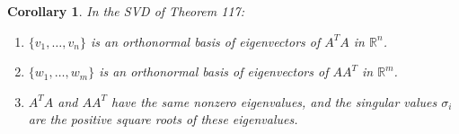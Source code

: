 \documentclass[12pt]{article}
\theoremstyle{break}             %
\newtheorem{cor}[thm]{Corollary}
\begin{document}
\begin{cor}
In the SVD of Theorem 117:
\begin{enumerate}
  \item \(\{v_1,\dots,v_n\}\) is an orthonormal basis of eigenvectors of \(A^T A\) in \(\mathbb{R}^n\).
  \item \(\{w_1,\dots,w_m\}\) is an orthonormal basis of eigenvectors of \(A A^T\) in \(\mathbb{R}^m\).
  \item \(A^T A\) and \(A A^T\) have the same nonzero eigenvalues, and the singular values \(\sigma_i\) are the positive square roots of these eigenvalues.
\end{enumerate}
\end{cor}
\end{document}
